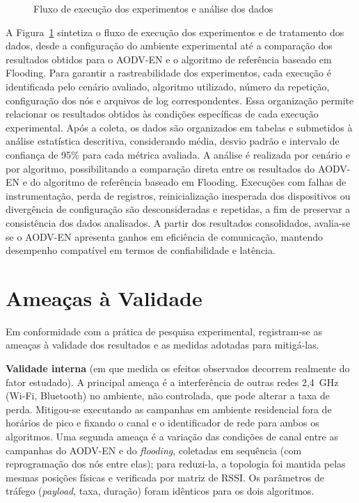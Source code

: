 \begin{figure}[H]
{
}
\caption{Fluxo de execução dos experimentos e análise dos dados}\label{fig:fluxo-execucao}
\end{figure}
A Figura~\ref{fig:fluxo-execucao} sintetiza o fluxo de execução dos experimentos e de
tratamento dos dados, desde a configuração do ambiente experimental até
a comparação dos resultados obtidos para o AODV-EN e o algoritmo de
referência baseado em Flooding. Para garantir a rastreabilidade dos
experimentos, cada execução é identificada pelo cenário
avaliado, algoritmo utilizado, número da repetição, configuração dos nós
e arquivos de log correspondentes. Essa organização permite relacionar
os resultados obtidos às condições específicas de cada execução
experimental. Após a coleta, os dados são organizados em tabelas e
submetidos à análise estatística descritiva, considerando média, desvio
padrão e intervalo de confiança de 95\% para cada métrica avaliada. A
análise é realizada por cenário e por algoritmo, possibilitando a
comparação direta entre os resultados do AODV-EN e do algoritmo de
referência baseado em Flooding. Execuções com falhas de instrumentação,
perda de registros, reinicialização inesperada dos dispositivos ou
divergência de configuração são desconsideradas e repetidas, a fim de
preservar a consistência dos dados analisados. A partir dos resultados
consolidados, avalia-se se o AODV-EN apresenta ganhos em eficiência
de comunicação, mantendo desempenho compatível em termos de
confiabilidade e latência.

\section{Ameaças à Validade}\label{ameacas-a-validade}

Em conformidade com a prática de pesquisa experimental, registram-se as
ameaças à validade dos resultados e as medidas adotadas para mitigá-las.

\textbf{Validade interna} (em que medida os efeitos observados decorrem
realmente do fator estudado). A principal ameaça é a interferência de
outras redes 2,4~GHz (Wi-Fi, Bluetooth) no ambiente, não controlada, que
pode alterar a taxa de perda. Mitigou-se executando as campanhas em
ambiente residencial fora de horários de pico e fixando o canal e o
identificador de rede para ambos os algoritmos. Uma segunda ameaça é a
variação das condições de canal entre as campanhas do AODV-EN e do
\emph{flooding}, coletadas em sequência (com reprogramação dos nós entre
elas); para reduzi-la, a topologia foi mantida pelas mesmas posições
físicas e verificada por matriz de RSSI. Os parâmetros de tráfego
(\emph{payload}, taxa, duração) foram idênticos para os dois algoritmos.

